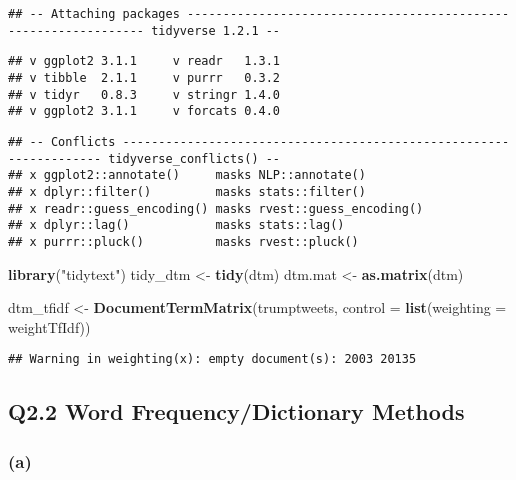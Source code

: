 \documentclass[]{article}
\newenvironment{Shaded}{\begin{snugshade}}{\end{snugshade}}
\newcommand{\KeywordTok}[1]{\textcolor[rgb]{0.13,0.29,0.53}{\textbf{#1}}}
\newcommand{\DataTypeTok}[1]{\textcolor[rgb]{0.13,0.29,0.53}{#1}}
\newcommand{\DecValTok}[1]{\textcolor[rgb]{0.00,0.00,0.81}{#1}}
\newcommand{\StringTok}[1]{\textcolor[rgb]{0.31,0.60,0.02}{#1}}
\newcommand{\OperatorTok}[1]{\textcolor[rgb]{0.81,0.36,0.00}{\textbf{#1}}}
\newcommand{\NormalTok}[1]{#1}
\begin{document}
\begin{verbatim}
## -- Attaching packages ---------------------------------------------------------------- tidyverse 1.2.1 --
\end{verbatim}

\begin{verbatim}
## v ggplot2 3.1.1     v readr   1.3.1
## v tibble  2.1.1     v purrr   0.3.2
## v tidyr   0.8.3     v stringr 1.4.0
## v ggplot2 3.1.1     v forcats 0.4.0
\end{verbatim}

\begin{verbatim}
## -- Conflicts ------------------------------------------------------------------- tidyverse_conflicts() --
## x ggplot2::annotate()     masks NLP::annotate()
## x dplyr::filter()         masks stats::filter()
## x readr::guess_encoding() masks rvest::guess_encoding()
## x dplyr::lag()            masks stats::lag()
## x purrr::pluck()          masks rvest::pluck()
\end{verbatim}

\begin{Shaded}
\begin{Highlighting}[]
\KeywordTok{library}\NormalTok{(}\StringTok{"tidytext"}\NormalTok{)}
\NormalTok{tidy_dtm <-}\StringTok{ }\KeywordTok{tidy}\NormalTok{(dtm)}
\NormalTok{dtm.mat <-}\StringTok{ }\KeywordTok{as.matrix}\NormalTok{(dtm)}

\NormalTok{dtm_tfidf <-}\StringTok{ }\KeywordTok{DocumentTermMatrix}\NormalTok{(trumptweets, }\DataTypeTok{control =} \KeywordTok{list}\NormalTok{(}\DataTypeTok{weighting =}\NormalTok{ weightTfIdf))}
\end{Highlighting}
\end{Shaded}

\begin{verbatim}
## Warning in weighting(x): empty document(s): 2003 20135
\end{verbatim}

\subsection{Q2.2 Word Frequency/Dictionary
Methods}\label{q2.2-word-frequencydictionary-methods}

\subsubsection{(a)}\label{a}

\begin{Shaded}
\end{Shaded}
\end{document}
